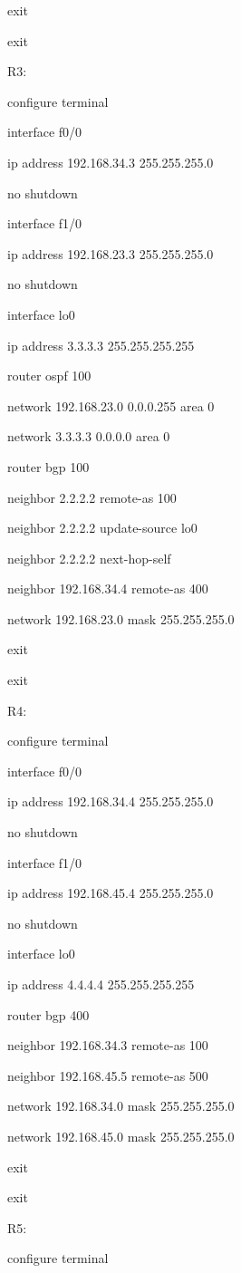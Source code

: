 \documentclass[12pt]{article}
\begin{document}
exit

exit

\noindent R3:

configure terminal

interface f0/0

ip address 192.168.34.3 255.255.255.0

no shutdown

interface f1/0

ip address 192.168.23.3 255.255.255.0

no shutdown

interface lo0

ip address 3.3.3.3 255.255.255.255

router ospf 100

network 192.168.23.0 0.0.0.255 area 0

network 3.3.3.3 0.0.0.0 area 0

router bgp 100

neighbor 2.2.2.2 remote-as 100

neighbor 2.2.2.2 update-source lo0

neighbor 2.2.2.2 next-hop-self

neighbor 192.168.34.4 remote-as 400

network 192.168.23.0 mask 255.255.255.0

exit

exit

\noindent R4:

configure terminal

interface f0/0

ip address 192.168.34.4 255.255.255.0

no shutdown

interface f1/0

ip address 192.168.45.4 255.255.255.0

no shutdown

interface lo0

ip address 4.4.4.4 255.255.255.255

router bgp 400

neighbor 192.168.34.3 remote-as 100

neighbor 192.168.45.5 remote-as 500

network 192.168.34.0 mask 255.255.255.0

network 192.168.45.0 mask 255.255.255.0

exit

exit

\noindent R5:

configure terminal
\end{document}
